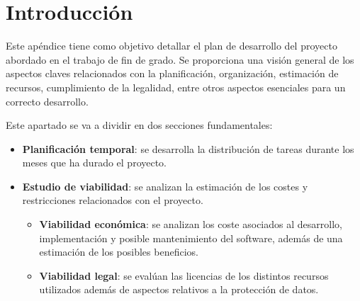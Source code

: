 
\section{Introducción}
\label{sec:PlanProyectoIntroduccion}
Este apéndice tiene como objetivo detallar el plan de desarrollo del proyecto abordado en el trabajo de fin de grado. Se proporciona una visión general de los aspectos claves relacionados con la planificación, organización, estimación de recursos, cumplimiento de la legalidad, entre otros aspectos esenciales para un correcto desarrollo.

Este apartado se va a dividir en dos secciones fundamentales:
\begin{itemize}
    \item \textbf{Planificación temporal}: se desarrolla la distribución de tareas durante los meses que ha durado el proyecto.
    \item \textbf{Estudio de viabilidad}: se analizan la estimación de los costes y restricciones relacionados con el proyecto.
    \begin{itemize}
        \item \textbf{Viabilidad económica}: se analizan los coste asociados al desarrollo, implementación y posible mantenimiento del software, además de una estimación de los posibles beneficios.
        \item \textbf{Viabilidad legal}: se evalúan las licencias de los distintos recursos utilizados además de aspectos relativos a la protección de datos.
    \end{itemize}
\end{itemize}


